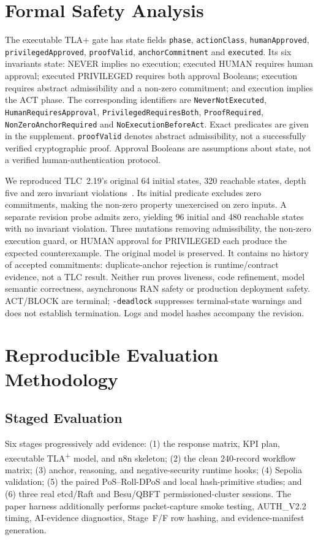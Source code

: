 \documentclass[journal]{IEEEtran}
\newif\ifshowrevisions
\newenvironment{revision}{\begingroup\ifshowrevisions\color{blue}\else\color{black}\fi}{\endgroup}
\begin{document}
\begin{revision}
\section{Formal Safety Analysis}
\label{sec:formal}
The executable TLA+ gate has state fields \texttt{phase}, \texttt{actionClass},
\texttt{humanApproved}, \texttt{privilegedApproved}, \texttt{proofValid},
\texttt{anchorCommitment} and \texttt{executed}. Its six invariants state:
NEVER implies no execution; executed HUMAN requires human approval;
executed PRIVILEGED requires both approval Booleans; execution requires
abstract admissibility and a non-zero commitment; and execution implies
the ACT phase. The corresponding identifiers are \texttt{NeverNotExecuted},
\texttt{HumanRequiresApproval}, \texttt{PrivilegedRequiresBoth},
\texttt{ProofRequired}, \texttt{NonZeroAnchorRequired} and
\texttt{NoExecutionBeforeAct}. Exact predicates are given in the supplement.
\texttt{proofValid} denotes abstract admissibility, not a successfully
verified cryptographic proof. Approval Booleans are assumptions about state,
not a verified human-authentication protocol.

We reproduced TLC~2.19's original 64 initial states, 320 reachable states,
depth five and zero invariant violations~\cite{lamportTla}. Its initial
predicate excludes zero commitments, making the non-zero property
unexercised on zero inputs. A separate revision probe admits zero, yielding
96 initial and 480 reachable states with no invariant violation. Three
mutations removing admissibility, the non-zero execution guard, or HUMAN
approval for PRIVILEGED each produce the expected counterexample. The
original model is preserved. It contains no history of accepted commitments:
duplicate-anchor rejection is runtime/contract evidence, not a TLC result.
Neither run proves liveness, code refinement, model semantic correctness,
asynchronous RAN safety or production deployment safety. ACT/BLOCK are
terminal; \texttt{-deadlock} suppresses terminal-state warnings and does not
establish termination. Logs and model hashes accompany the revision.
\end{revision}

\section{Reproducible Evaluation Methodology}
\label{sec:methodology}
\subsection{Staged Evaluation}
Six stages progressively add evidence: (1) the response
matrix, KPI plan, executable TLA\textsuperscript{+} model, and n8n skeleton;
(2) the clean
240-record workflow matrix; (3) anchor, reasoning, and negative-security
runtime hooks; (4) Sepolia validation; (5) the paired PoS--Roll-DPoS and local
hash-primitive studies; and (6) three real etcd/Raft and Besu/QBFT
permissioned-cluster sessions. The paper harness additionally performs
packet-capture smoke testing, AUTH\_V2.2 timing, AI-evidence diagnostics,
Stage~F/F row hashing, and evidence-manifest generation.
\end{document}
